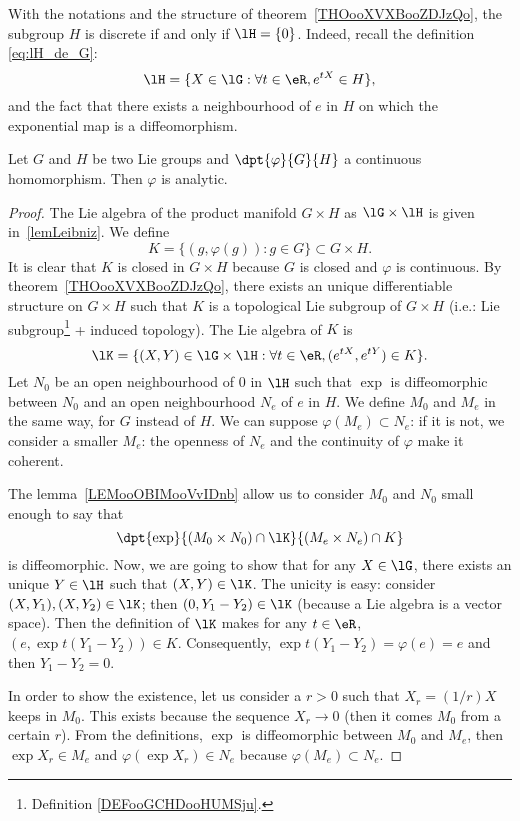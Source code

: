 With the notations and the structure of theorem~\ref{THOooXVXBooZDJzQo}, the subgroup $H$ is discrete if and only if $\lH=\{0\}$. Indeed, recall the definition \eqref{eq:lH_de_G}:
\[
	\lH=\{X\in\lG: \forall t\in\eR, e^{tX}\in H\},
\]
and the fact that there exists a neighbourhood of $e$ in $H$ on which the exponential map is a diffeomorphism.

\begin{theorem}
	Let $G$ and $H$ be two Lie groups and $\dpt{\varphi}{G}{H}$ a continuous homomorphism. Then $\varphi$ is analytic.
\end{theorem}

\begin{proof}
	The Lie algebra of the product manifold $G\times H$ as $\lG\times\lH$ is given in~\ref{lemLeibniz}. We define
	\begin{equation}
		K=\{(g,\varphi(g)):g\in G\}\subset G\times H.
	\end{equation}
	It is clear that $K$ is closed in $G\times H$ because $G$ is closed and $\varphi$ is continuous.
	By theorem~\ref{THOooXVXBooZDJzQo}, there exists an unique differentiable structure on $G\times H$ such that $K$ is a topological Lie subgroup of $G\times H$ (i.e.: Lie subgroup\footnote{Definition \ref{DEFooGCHDooHUMSju}.} + induced topology). The Lie algebra of $K$ is
	\begin{equation}
		\lK=\{(X,Y)\in\lG\times\lH:\forall t\in\eR, (e^{tX},e^{tY})\in K\}.
	\end{equation}
	Let $N_0$ be an open neighbourhood of $0$ in $\lH$ such that $\exp$ is diffeomorphic between $N_0$ and an open neighbourhood $N_e$ of $e$ in $H$. We define $M_0$ and $M_e$ in the same way, for $G$ instead of $H$. We can suppose $\varphi(M_e)\subset N_e$: if it is not, we consider a smaller $M_e$: the openness of $N_e$ and the continuity of $\varphi$ make it coherent.

	The lemma~\ref{LEMooOBIMooVvIDnb} allow us to consider $M_0$ and $N_0$ small enough to say that
	\[
		\dpt{\exp}{(M_0\times N_0)\cap\lK}{(M_e\times N_e)\cap K}
	\]
	is diffeomorphic. Now, we are going to show that for any $X\in\lG$, there exists an unique $Y\in\lH$ such that $(X,Y)\in\lK$. The unicity is easy: consider $(X,Y_1),(X,Y_2)\in\lK$; then $(0,Y_1-Y_2)\in\lK$ (because a Lie algebra is a vector space). Then the definition of $\lK$ makes for any $t\in\eR$, $(e,\exp{t(Y_1-Y_2)})\in K$. Consequently, $\exp t(Y_1-Y_2)=\varphi(e)=e$ and then $Y_1-Y_2=0$.

	In order to show the existence, let us consider a $r>0$ such that $X_r=(1/r)X$ keeps in $M_0$. This exists because the sequence $X_r\to 0$ (then it comes $M_0$ from a certain $r$). From the definitions, $\exp$ is diffeomorphic between $M_0$ and $M_e$, then $\exp X_r\in M_e$ and $\varphi(\exp X_r)\in N_e$ because $\varphi(M_e)\subset N_e$.


\end{proof}
